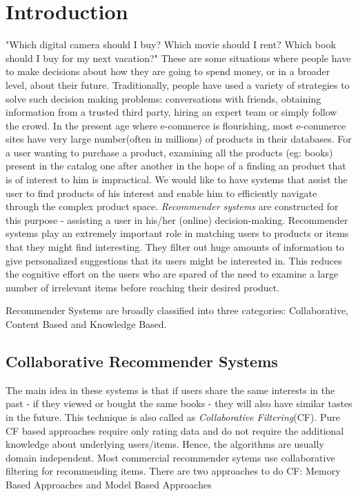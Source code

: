 
\chapter{Introduction}
\label{chap:intro}
"Which digital camera should I buy? Which movie should I rent? Which book should I buy for my next vacation?" These are some situations where people have to make decisions about how they are going to spend money, or in a broader level, about their future.
Traditionally, people have used a variety of strategies to solve such decision making problems: conversations with friends, obtaining information from a trusted third party, hiring an expert team or simply follow the crowd. 
In the present age where e-commerce is flourishing, most e-commerce sites have very large number(often in millions) of products in their databases.
For a user wanting to purchase a product, examining all the products (eg: books) present in the catalog one after another in the hope of a finding an product that is of interest to him is impractical.
We would like to have systems that assist the user to find products of his interest and enable him to efficiently navigate through the complex product space.
\textit{Recommender systems} are constructed for this purpose - assisting a user in his/her (online) decision-making.
Recommender systems play an extremely important role in matching users to products or items that they might find interesting. 
They filter out huge amounts of information to give personalized suggestions that its users might be interested in. 
This reduces the cognitive effort on the users who are spared of the need to examine a large number of irrelevant items before reaching their desired product.

Recommender Systems are broadly classified into three categories: Collaborative, Content Based and Knowledge Based.

\section{Collaborative Recommender Systems}
\label{sec:CF}
 The main idea in these systems is that if users share the same interests in the past - if they viewed or bought the same books - they will also have similar tastes in the future. 
This technique is also called as \textit{Collaborative Filtering}(CF). 
Pure CF based approaches require only rating data and do not require the additional knowledge about underlying users/items. 
Hence, the algorithms are usually domain independent. Most commercial recommender sytems use collaborative filtering for recommending items.
There are two approaches to do CF: Memory Based Approaches and Model Based Approaches

